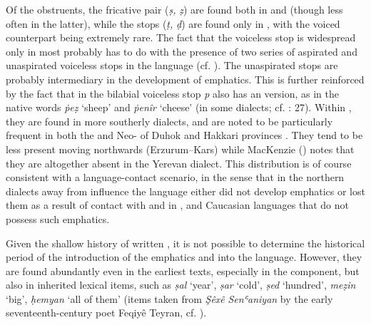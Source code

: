 \documentclass[output=paper]{langsci/langscibook}
\begin{document}
Of the  obstruents, the fricative pair (\textit{ṣ,} \textit{ẓ}) are found both in  and   (though less often in the latter), while the stops (\textit{ṭ,} \textit{ḍ}) are found only in  , with the voiced counterpart being extremely rare. The fact that the voiceless  stop is widespread only in   most probably has to do with the presence of two series of aspirated and unaspirated voiceless stops in the language (cf. ). The unaspirated stops are probably intermediary in the development of emphatics. This is further reinforced by the fact that in   the bilabial voiceless stop \textit{p} also has an  version, as in the native words \textit{ṗeẓ} ‘sheep’ and \textit{ṗenîr} ‘cheese’ (in some dialects; cf. \citealt{Kahn1976}: 27). Within  , they are found in more southerly dialects, and are noted to be particularly frequent in both the  and Neo- of Duhok and Hakkari provinces  \citep[329]{Blau1989}. They tend to be less present moving northwards (Erzurum–Kars) while MacKenzie (\citeyear[43]{MacKenzie1961}) notes that they are altogether absent in the Yerevan dialect. This distribution is of course consistent with a language-contact scenario, in the sense that in the northern dialects away from  influence the language either did not develop emphatics or lost them as a result of contact with and  in ,  and Caucasian languages that do not possess such emphatics.   

Given the shallow history of written , it is not possible to determine the historical period of the introduction of the emphatics and  into the language. However, they are found abundantly even in the earliest  texts, especially in the  component, but also in inherited lexical items, such as \textit{ṣal} ‘year’, \textit{ṣar} ‘cold’, \textit{ṣed} ‘hundred’, \textit{meẓin} ‘big’, \textit{ḥemyan} ‘all of them’ (items taken from \textit{Şêxê} \textit{Senʿaniyan} by the early seventeenth-century poet Feqiyê Teyran, cf. \citealt{Teyran2011}). 
\end{document}
